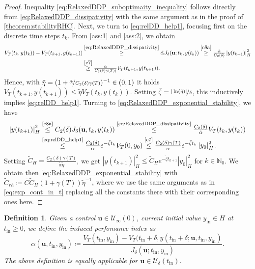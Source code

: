 \documentclass{m2an}
\newcommand{\N}{\mathbb N}
\newcommand{\bu}{\mathbf{u}}
\newcommand{\tint}{t_{\mathrm{in}}}
\newcommand{\yint}{y_{\mathrm{in}}}
\newcommand{\mU}{{\mathscr U}}
\newcommand{\norm}[2]{\left|#1\right|_{#2}}
\newtheorem{definition}[thrm]{Definition}
\begin{document}
\begin{proof}
    Inequality \eqref{eq:RelaxedDDP_suboptimaity_inequality} follows directly from \eqref{eq:RelaxedDDP_dissipativity} with the same argument as in the proof of \cref{theorem:stabilityRHC}. Next, we turn to \eqref{eq:relDD_help1}, focusing first on the discrete time steps $t_k$. From \cref{ass:1} and \cref{ass:2}, we obtain
    \begin{align*}
         V_T(t_k,y(t_k)) - V_T(t_{k+1},y(t_{k+1})) & \stackrel{\eqref{eq:RelaxedDDP_dissipativity}}{\geq} \tilde\alpha J_\delta(\bu;t_k,y(t_k))\stackrel{\eqref{e8a}}{\geq} \tfrac{\tilde\alpha}{C_2(\delta)}\norm{y(t_{k+1})}{H}^2\\
         &\stackrel{\eqref{e7}}{\geq}\tfrac{\tilde\alpha}{C_2(\delta)\gamma(T))}V_T(t_{k+1},y(t_{k+1})).
    \end{align*}
    Hence, with $\tilde \eta=(1+\nicefrac{\tilde\alpha}{C_2(\delta)\gamma(T)})^{-1}\in (0,1)$ it holds $V_T(t_{k+1},y(t_{k+1})) \leq\tilde \eta V_T(t_k,y(t_k))$. Setting $\tilde\zeta=\nicefrac{|\ln(\tilde\eta)|}{\delta}$, this inductively implies \eqref{eq:relDD_help1}. Turning to \eqref{eq:RelaxedDDP_exponential_stability}, we have
    \begin{equation}
    \label{e132}
    \begin{split}
    \norm{y(t_{k+1})}{H}^2 &\stackrel{\text{\eqref{e8a}}}{\leq} C_2(\delta) J_\delta(\bu,t_k,y(t_k)) \stackrel{\text{\eqref{eq:RelaxedDDP_dissipativity}}}{\leq} \tfrac{C_2(\delta)}{\tilde \alpha} V_T( t_{k} , y(t_{k}))\\
    & \stackrel{\text{\eqref{eq:relDD_help1}}}{\leq} \tfrac{C_2(\delta)}{\tilde \alpha}  e^{-\tilde\zeta t_{k}} V_T(0, y_0) \stackrel{\text{\eqref{e7}}}{\leq} \tfrac{C_2(\delta)\gamma(T)}{\tilde \alpha}  e^{-\tilde\zeta t_{k}} \norm{y_0}{H}^2.
    \end{split}
    \end{equation}
    Setting $\tilde C_H=\tfrac{ C_2(\delta) \gamma(T)}{\tilde\alpha\tilde\eta}$, we get $\norm{y(t_{k+1})}{H}^2 \leq \tilde C_H e^{-\tilde\zeta t_{k+1}} \norm{y_0}{H}^2$ for $k \in \N_0$.
    We obtain then \eqref{eq:RelaxedDDP_exponential_stability} with $\tilde C_{rh} \coloneqq\bar{C}\tilde C_H(1+\gamma(T))\tilde\eta^{-1}$, where we use the same arguments as in \eqref{eq:exp_cont_in_t} replacing all the constants there with their corresponding ones here.
\end{proof} 
%
\begin{definition}\label{def:current_perfind}
    Given a control $\bu \in \mU_\infty(0)$, current initial value $\yint\in H$ at $\tint \geq 0$, we define the induced perfomance index as
    \begin{equation}\label{eq:current_pfind}
        \alpha(\bu,\tint,\yint)\coloneqq \frac{ V_T(\tint, \yint) -  V_T(\tint+\delta, y(\tint+\delta;\bu,\tint,\yint)}{J_\delta(\bu;\tint,\yint) }.
    \end{equation}
    The above definition is equally applicable for $\bu \in \mU_\delta(\tint)$.
\end{definition}
\end{document}
